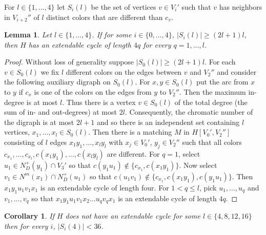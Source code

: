 \documentclass{article}
\newtheorem{cor}[theorem]{Corollary}
\newtheorem{lemma}[theorem]{Lemma}
\begin{document}
For $l \in \{1, \dots, 4\}$ let $S_i(l)$ be the set of vertices $v\in V_i'$ such that $v$ has neighbors in $V_{i+2}''$ of $l$ distinct colors that are different than $c_v$.
\begin{lemma}\label{ext-lem-S(l)}
Let $l \in \{ 1, \dots, 4\}$. If for some $i\in \{0,\dots, 4\}$, $|S_i(l)|\geq (2l{{+}}1)l$, then $H$ has an extendable cycle of length $4q$ for every $q=1,\dots, l$.
\end{lemma}
\begin{proof}
Without loss of generality suppose $|S_0(l)|\geq (2l{{+}}1)l$. 
For each $v\in S_0(l)$ we fix $l$ different colors on the edges between $v$ and $V_2''$ and consider the following auxiliary digraph on $S_0(l)$. For $x,y\in S_0(l)$ put the arc from $x$ to $y$ if $c_x$ is one of the colors on the edges from $y$ to $V_2''$. Then the maximum in-degree is at most $l$. Thus there is a vertex $v\in S_0(l)$ of the total degree (the sum of in- and out-degrees) at most $2l$. Consequently, the chromatic number of the digraph is at most $2l+1$ and so there is an independent set containing $l$ vertices, $x_1, \dots, x_l\in S_0(l)$. Then there is a matching $M$ in $H[V_0', V_{2}'']$ consisting of $l$ edges  $x_1y_1, \dots, x_ly_l$ with $x_j\in V_0'$, $y_j\in V_2''$  such that all colors $c_{x_1},\dots, c_{x_l}, c(x_1y_1),\dots, c(x_ly_l)$   are different. 
For $q=1$, select $u_1\in N^+_D(y_1)\cap V_3'$ so that $c(y_1u_1)\notin \{c_{x_1}, c(x_1y_1)\}.$ Now select $v_1\in N^m(x_1)\cap N^+_D(u_1)$ so that $c(u_1v_1)\notin \{c_{x_1}, c(x_1y_1), c(y_1u_1)\}$. Then $x_1y_1u_1v_1x_1$ is an extendable cycle of length four. 
For $1<q\leq l$,   pick $u_1, \dots, u_q$ and $v_1, \dots, v_q$ so that $x_1y_1u_1v_1x_2\dots u_qv_qx_1$ is an extendable cycle of length $4q$. 
\end{proof}

\begin{cor}\label{ext-cor-S(l)}
    If $H$ does not have an extendable cycle for some $l\in \{4, 8, 12, 16\}$ then for every $i$, $|S_i(4)| < 36$.
\end{cor}
\end{document}

